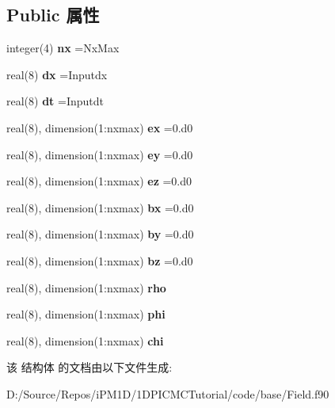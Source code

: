 \subsection*{Public 属性}
\begin{DoxyCompactItemize}
\item 
\mbox{\label{structmodulefield_1_1field_a773be4b6f2abf5d27c182a913cbc78c9}} 
integer(4) {\bfseries nx} =Nx\+Max
\item 
\mbox{\label{structmodulefield_1_1field_aebc80569487ee919762bc8b88d8af1c3}} 
real(8) {\bfseries dx} =Inputdx
\item 
\mbox{\label{structmodulefield_1_1field_a838bbf9d58c4a1044c1a5505ad9bfb0c}} 
real(8) {\bfseries dt} =Inputdt
\item 
\mbox{\label{structmodulefield_1_1field_a652e366a8bbb31b48eb06efb3c9ca987}} 
real(8), dimension(1\+:nxmax) {\bfseries ex} =0.d0
\item 
\mbox{\label{structmodulefield_1_1field_a2a5235bf5150da52ed0f5c5f8ca23ebd}} 
real(8), dimension(1\+:nxmax) {\bfseries ey} =0.d0
\item 
\mbox{\label{structmodulefield_1_1field_ada7acb9ff451319f1311b66a49dedb3d}} 
real(8), dimension(1\+:nxmax) {\bfseries ez} =0.d0
\item 
\mbox{\label{structmodulefield_1_1field_a9e9dc947f75d0c69eef7907d20959cd3}} 
real(8), dimension(1\+:nxmax) {\bfseries bx} =0.d0
\item 
\mbox{\label{structmodulefield_1_1field_ae676e1a9f0fe9e5dd084a31fba7a8ee3}} 
real(8), dimension(1\+:nxmax) {\bfseries by} =0.d0
\item 
\mbox{\label{structmodulefield_1_1field_ac9b6517cdcae03140a55e8a26d4d1535}} 
real(8), dimension(1\+:nxmax) {\bfseries bz} =0.d0
\item 
\mbox{\label{structmodulefield_1_1field_ac62f07da6229e1959a94cc7ac03ab8b1}} 
real(8), dimension(1\+:nxmax) {\bfseries rho}
\item 
\mbox{\label{structmodulefield_1_1field_a58dedb6b02be240a7da1155dff79be9c}} 
real(8), dimension(1\+:nxmax) {\bfseries phi}
\item 
\mbox{\label{structmodulefield_1_1field_a7b8411f0289a18c9170d643771c0072e}} 
real(8), dimension(1\+:nxmax) {\bfseries chi}
\end{DoxyCompactItemize}


该 结构体 的文档由以下文件生成\+:\begin{DoxyCompactItemize}
\item 
D\+:/\+Source/\+Repos/i\+P\+M1\+D/1\+D\+P\+I\+C\+M\+C\+Tutorial/code/base/Field.\+f90\end{DoxyCompactItemize}

